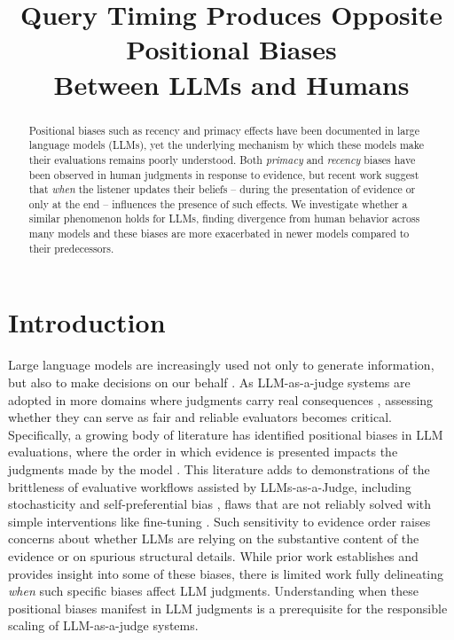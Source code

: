 \documentclass[11pt, letterpaper]{article}
\title{Query Timing Produces Opposite Positional Biases\\ Between LLMs and Humans}
\author{}
\begin{document}
\maketitle


\begin{abstract}
Positional biases such as recency and primacy effects have been documented in large language models (LLMs), yet the underlying mechanism by which these models make their evaluations remains poorly understood. Both \emph{primacy} and \emph{recency} biases have been observed in human judgments in response to evidence, but recent work suggest that \emph{when} the listener updates their beliefs -- during the presentation of evidence or only at the end -- influences the presence of such effects. We investigate whether a similar phenomenon holds for LLMs, finding divergence from human behavior across many models and these biases are more exacerbated in newer models compared to their predecessors.
\end{abstract}


\section{Introduction}

Large language models are increasingly used not only to generate information, but also to make decisions on our behalf \cite{li2024llms, zheng2023judging}. As LLM-as-a-judge systems are adopted in more domains where judgments carry real consequences \cite{li2024llms}, assessing whether they can serve as fair and reliable evaluators becomes critical. Specifically, a growing body of literature has identified positional biases in LLM evaluations, where the order in which evidence is presented impacts the judgments made by the model \cite{schilcher2025characterizing, sun2025posum, wang2024large}. This literature adds to demonstrations of the brittleness of evaluative workflows assisted by LLMs-as-a-Judge, including stochasticity \cite{lee2025evaluating} and self-preferential bias \cite{panickssery2404llm}, flaws that are not reliably solved with simple interventions like fine-tuning \cite{zhu2023judgelm}. Such sensitivity to evidence order raises concerns about whether LLMs are relying on the substantive content of the evidence or on spurious structural details. While prior work establishes and provides insight into some of these biases, there is limited work fully delineating \emph{when} such specific biases affect LLM judgments. Understanding when these positional biases manifest in LLM judgments is a prerequisite for the responsible scaling of LLM-as-a-judge systems.
\end{document}
